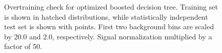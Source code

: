 \begin{figure}[h]
    \centering
    \caption[Boosted decision tree overtraining check.]{Overtraining
      check for optimized boosted decision tree. Training set is shown
    in hatched distributions, while statistically independent test set
    is shown with points. First two background bins are scaled by 20.0
    and 2.0, respectively. Signal normalization multiplied by a factor
    of 50.}
\label{chap:bdt:fig:overtraining}
\end{figure}
